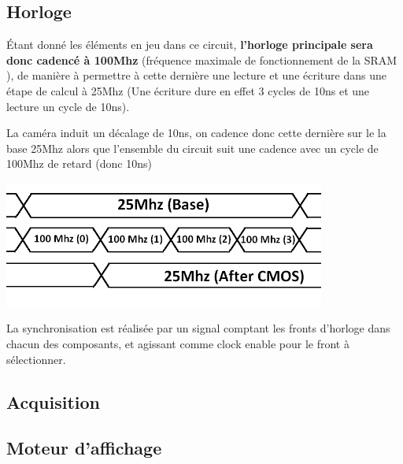 \documentclass[10pt,a4paper]{article}
\begin{document}
\subsection{Horloge}
Étant donné les éléments en jeu dans ce circuit, \textbf{l'horloge principale sera donc cadencé à 100Mhz} (fréquence maximale de fonctionnement de la SRAM ), de manière à permettre à cette dernière une lecture et une écriture dans une étape de calcul à 25Mhz (Une écriture dure en effet 3 cycles de 10ns et une lecture un cycle de 10ns).

La caméra induit un décalage de 10ns, on cadence donc cette dernière sur le la base 25Mhz alors que l'ensemble du circuit suit une cadence avec un cycle de 100Mhz de retard (donc 10ns)
\begin{center}
\includegraphics[width=300pt]{gfx/clock.png}
\end{center}
La synchronisation est réalisée par un signal comptant les fronts d'horloge dans chacun des composants, et agissant comme clock enable pour le front à sélectionner.

\subsection{Acquisition}

\subsection{Moteur d'affichage}
\end{document}

